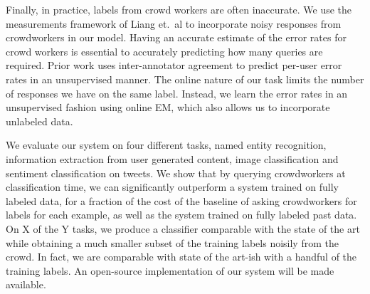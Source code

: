 
Finally, in practice, labels from crowd workers are often inaccurate.
We use the measurements framework of Liang et.\ al\cite{liang09measurements} to incorporate noisy responses from crowdworkers in our model.
Having an accurate estimate of the error rates for crowd workers is essential to accurately predicting how many queries are required.
Prior work uses inter-annotator agreement to predict per-user error rates in an unsupervised manner. 
The online nature of our task limits the number of responses we have on the same label.
Instead, we learn the error rates in an unsupervised fashion using online EM, which also allows us to incorporate unlabeled data.

We evaluate our system on four different tasks, named entity recognition, information extraction from user generated content, image classification and sentiment classification on tweets.
We show that by querying crowdworkers at classification time, we can significantly outperform a system trained on fully labeled data, for a fraction of the cost of the baseline of asking crowdworkers for labels for each example, as well as the system trained on fully labeled past data.
On X of the Y tasks, we produce a classifier comparable with the state of the art while obtaining a much smaller subset of the training labels noisily from the crowd. 
In fact, we are comparable with state of the art-ish with a handful of the training labels.
An open-source implementation of our system will be made available.

